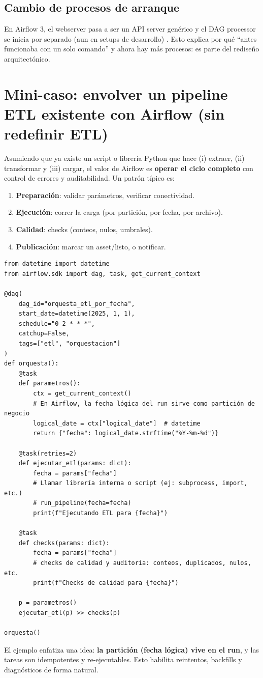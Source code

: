 \subsection{Cambio de procesos de arranque}
En Airflow 3, el webserver pasa a ser un API server genérico y el DAG processor se inicia por separado (aun en setups de desarrollo) \cite{airflow_upgrade_3_breaking}. Esto explica por qué ``antes funcionaba con un solo comando'' y ahora hay más procesos: es parte del rediseño arquitectónico.

\section{Mini-caso: envolver un pipeline ETL existente con Airflow (sin redefinir ETL)}
Asumiendo que ya existe un script o librería Python que hace (i) extraer, (ii) transformar y (iii) cargar, el valor de Airflow es \textbf{operar el ciclo completo} con control de errores y auditabilidad. Un patrón típico es:
\begin{enumerate}[leftmargin=*]
  \item \textbf{Preparación}: validar parámetros, verificar conectividad.
  \item \textbf{Ejecución}: correr la carga (por partición, por fecha, por archivo).
  \item \textbf{Calidad}: checks (conteos, nulos, umbrales).
  \item \textbf{Publicación}: marcar un asset/listo, o notificar.
\end{enumerate}

\begin{lstlisting}[style=python,caption={Esqueleto de DAG para orquestar un script ETL existente por fecha}]
from datetime import datetime
from airflow.sdk import dag, task, get_current_context

@dag(
    dag_id="orquesta_etl_por_fecha",
    start_date=datetime(2025, 1, 1),
    schedule="0 2 * * *",
    catchup=False,
    tags=["etl", "orquestacion"]
)
def orquesta():
    @task
    def parametros():
        ctx = get_current_context()
        # En Airflow, la fecha lógica del run sirve como partición de negocio
        logical_date = ctx["logical_date"]  # datetime
        return {"fecha": logical_date.strftime("%Y-%m-%d")}

    @task(retries=2)
    def ejecutar_etl(params: dict):
        fecha = params["fecha"]
        # Llamar librería interna o script (ej: subprocess, import, etc.)
        # run_pipeline(fecha=fecha)
        print(f"Ejecutando ETL para {fecha}")

    @task
    def checks(params: dict):
        fecha = params["fecha"]
        # checks de calidad y auditoría: conteos, duplicados, nulos, etc.
        print(f"Checks de calidad para {fecha}")

    p = parametros()
    ejecutar_etl(p) >> checks(p)

orquesta()
\end{lstlisting}
El ejemplo enfatiza una idea: \textbf{la partición (fecha lógica) vive en el run}, y las tareas son idempotentes y re-ejecutables. Esto habilita reintentos, backfills y diagnósticos de forma natural.

